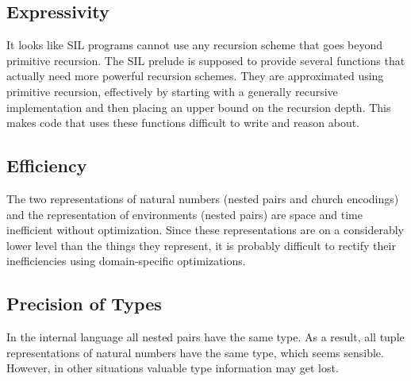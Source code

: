 \documentclass{scrartcl}
\begin{document}
\subsection{Expressivity}

It looks like SIL programs cannot use any recursion scheme that goes
beyond primitive recursion. The SIL prelude is supposed to provide
several functions that actually need more powerful recursion schemes.
They are approximated using primitive recursion, effectively by starting
with a generally recursive implementation and then placing an upper
bound on the recursion depth. This makes code that uses these functions
difficult to write and reason about.

\subsection{Efficiency}

The two representations of natural numbers (nested pairs and church
encodings) and the representation of environments (nested pairs) are
space and time inefficient without optimization. Since these
representations are on a considerably lower level than the things they
represent, it is probably difficult to rectify their inefficiencies
using domain-specific optimizations.

\subsection{Precision of Types}

In the internal language all nested pairs have the same type. As a
result, all tuple representations of natural numbers have the same type,
which seems sensible. However, in other situations valuable type
information may get lost.
\end{document}

